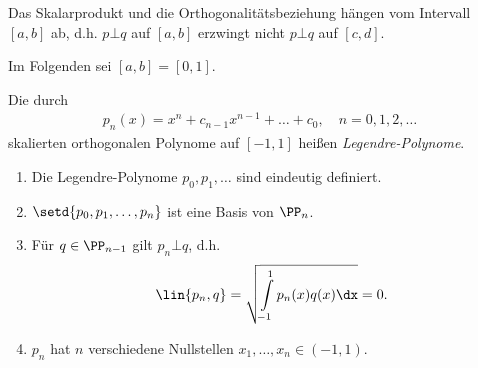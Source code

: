 Das Skalarprodukt und die Orthogonalitätsbeziehung hängen vom Intervall $[a,b]$
ab, d.h. $p\bot q$ auf $[a,b]$ erzwingt nicht $p\bot q$ auf $[c,d]$.

Im Folgenden sei $[a,b]=[0,1]$.

\begin{defn}
\label{defn:4.6}
Die durch
\begin{align*}
p_n(x) = x^n + c_{n-1}x^{n-1}+ \ldots + c_0,\quad n=0,1,2,\ldots
\end{align*}
skalierten orthogonalen Polynome auf $[-1,1]$ heißen
\emph{Legendre-Polynome}.\fishhere
\end{defn}

\begin{prop}
\label{prop:4.7}
\begin{enumerate}[label=(\roman{*})]
  \item\label{prop:4.7:1} Die Legendre-Polynome $p_0,p_1,\ldots$ sind eindeutig
  definiert.
  \item\label{prop:4.7:2} $\setd{p_0,p_1,\ldots,p_n}$ ist eine Basis von
  $\PP_n$.
  \item\label{prop:4.7:3} Für $q\in\PP_{n-1}$ gilt $p_n\bot q$, d.h.
\begin{align*}
\lin{p_n,q} = \sqrt{\int\limits_{-1}^1 p_n(x)q(x)\dx} = 0.
\end{align*}
\item\label{prop:4.7:4} $p_n$ hat $n$ verschiedene Nullstellen
$x_1,\ldots,x_n\in(-1,1)$.\fishhere
\end{enumerate}
\end{prop}
